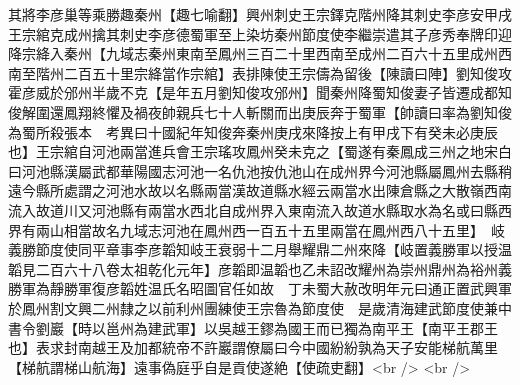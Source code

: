 其將李彦巢等乘勝趣秦州【趣七喻翻】興州刺史王宗鐸克階州降其刺史李彦安甲戌王宗綰克成州擒其刺史李彦德蜀軍至上染坊秦州節度使李繼崇遣其子彦秀奉牌印迎降宗絳入秦州【九域志秦州東南至鳳州三百二十里西南至成州二百六十五里成州西南至階州二百五十里宗絳當作宗綰】表排陳使王宗儔為留後【陳讀曰陣】劉知俊攻霍彦威於邠州半歲不克【是年五月劉知俊攻邠州】聞秦州降蜀知俊妻子皆遷成都知俊解圍還鳳翔終懼及禍夜帥親兵七十人斬關而出庚辰奔于蜀軍【帥讀曰率為劉知俊為蜀所殺張本　考異曰十國紀年知俊奔秦州庚戌來降按上有甲戌下有癸未必庚辰也】王宗綰自河池兩當進兵會王宗瑤攻鳳州癸未克之【蜀遂有秦鳳成三州之地宋白曰河池縣漢屬武都華陽國志河池一名仇池按仇池山在成州界今河池縣屬鳳州去縣稍遠今縣所處謂之河池水故以名縣兩當漢故道縣水經云兩當水出陳倉縣之大散嶺西南流入故道川又河池縣有兩當水西北自成州界入東南流入故道水縣取水為名或曰縣西界有兩山相當故名九域志河池在鳳州西一百五十五里兩當在鳳州西八十五里】　岐義勝節度使同平章事李彦韜知岐王衰弱十二月舉耀鼎二州來降【岐置義勝軍以授温韜見二百六十八卷太祖乾化元年】彦韜即温韜也乙未詔改耀州為崇州鼎州為裕州義勝軍為靜勝軍復彦韜姓温氏名昭圖官任如故　丁未蜀大赦改明年元曰通正置武興軍於鳳州割文興二州隸之以前利州團練使王宗魯為節度使　是歲清海建武節度使兼中書令劉巖【時以邕州為建武軍】以吳越王鏐為國王而已獨為南平王【南平王郡王也】表求封南越王及加都統帝不許巖謂僚屬曰今中國紛紛孰為天子安能梯航萬里【梯航謂梯山航海】遠事偽庭乎自是貢使遂絶【使疏吏翻】<br />
<br />
